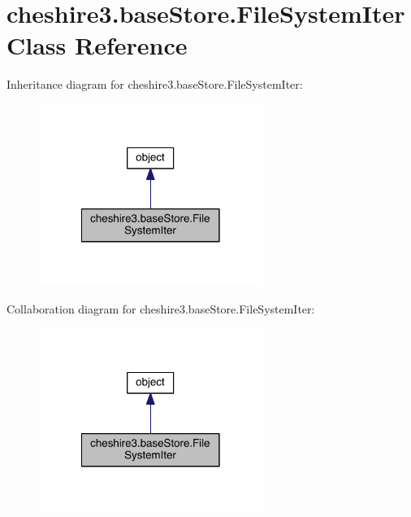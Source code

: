 \hypertarget{classcheshire3_1_1base_store_1_1_file_system_iter}{\section{cheshire3.\-base\-Store.\-File\-System\-Iter Class Reference}
\label{classcheshire3_1_1base_store_1_1_file_system_iter}
}


Inheritance diagram for cheshire3.\-base\-Store.\-File\-System\-Iter\-:
\nopagebreak
\begin{figure}[H]
\begin{center}
\leavevmode
\includegraphics[width=206pt]{classcheshire3_1_1base_store_1_1_file_system_iter__inherit__graph}
\end{center}
\end{figure}


Collaboration diagram for cheshire3.\-base\-Store.\-File\-System\-Iter\-:
\nopagebreak
\begin{figure}[H]
\begin{center}
\leavevmode
\includegraphics[width=206pt]{classcheshire3_1_1base_store_1_1_file_system_iter__coll__graph}
\end{center}
\end{figure}
